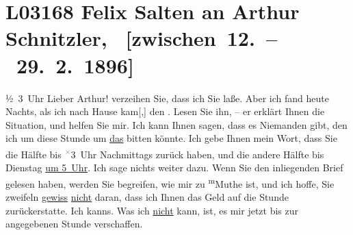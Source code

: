 

\section[ Felix Salten an Arthur Schnitzler, {[}zwischen 12. – 29. 2. 1896{]}]{L03168 Felix Salten an Arthur Schnitzler,  {[}zwischen 12. – 29. 2. 1896{]}}
\nopagebreak{}
\rehead{ }\normalsize\beginnumbering{}
\toendnotes[C]{\smallbreak\pagebreak[2]}
\toendnotes[C]{\smallbreak}
\toendnotes[C]{\smallbreak}
\pstart
           \raggedleft{}{\pb}½ 3 Uhr\pend
           \vspace{0.5em}
\pstart
           Lieber Arthur! verzeihen Sie, dass ich Sie \label{K_L03168-1v}\label{K_L03168-1} laße. Aber ich fand heute{ }Nachts, als ich nach Hause kam{[},{]} den \label{K_L03168-2v}\label{K_L03168-2}. Lesen Sie ihn, – er erklärt
               Ihnen die Situation, und helfen Sie mir. Ich kann Ihnen sagen, dass es Niemanden
               gibt, den ich um diese Stunde um \uline{das} bitten könnte.
               Ich gebe Ihnen mein Wort, dass Sie die Hälfte bis \substVorne{}\textsuperscript{\textcolor{gray}{×}}\substDazwischen{}3\substHinten{} Uhr Nachmittags zurück haben, und die andere Hälfte bis
                  Dienstag{ }{\pb}\uline{um 5 Uhr}. Ich sage nichts weiter dazu. Wenn Sie den inliegenden Brief gelesen haben,
               werden Sie begreifen, wie mir zu \substVorne{}\textsuperscript{m}\substDazwischen{}M\substHinten{}uthe ist, und ich hoffe, Sie zweifeln \uline{gewiss}{ }\uline{nicht} daran, dass ich Ihnen das Geld auf die Stunde
               zurückerstatte. Ich kanns. Was ich \uline{nicht} kann, ist,
               es mir jetzt bis zur angegebenen Stunde verschaffen.\pend
           
